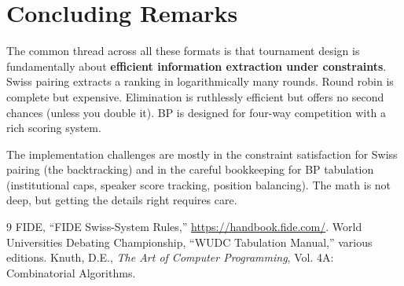 \documentclass[11pt]{article}
\begin{document}
\section{Concluding Remarks}

The common thread across all these formats is that tournament design is fundamentally about \textbf{efficient information extraction under constraints}. Swiss pairing extracts a ranking in logarithmically many rounds. Round robin is complete but expensive. Elimination is ruthlessly efficient but offers no second chances (unless you double it). BP is designed for four-way competition with a rich scoring system.

The implementation challenges are mostly in the constraint satisfaction for Swiss pairing (the backtracking) and in the careful bookkeeping for BP tabulation (institutional caps, speaker score tracking, position balancing). The math is not deep, but getting the details right requires care.

\begin{thebibliography}{9}
 FIDE, ``FIDE Swiss-System Rules,'' \url{https://handbook.fide.com/}.
 World Universities Debating Championship, ``WUDC Tabulation Manual,'' various editions.
 Knuth, D.E., \textit{The Art of Computer Programming}, Vol. 4A: Combinatorial Algorithms.
\end{thebibliography}
\end{document}
